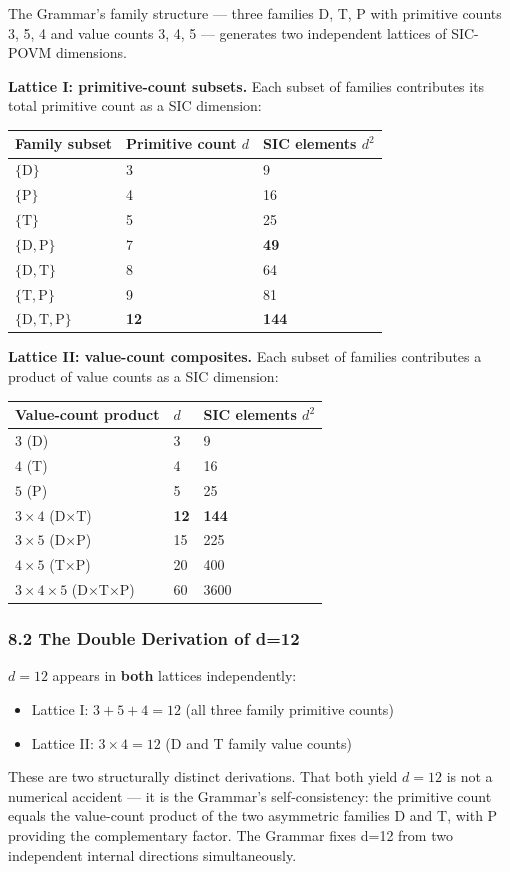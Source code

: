 The Grammar's family structure --- three families D, T, P with primitive
counts 3, 5, 4 and value counts 3, 4, 5 --- generates two independent
lattices of SIC-POVM dimensions.

\textbf{Lattice I: primitive-count subsets.} Each subset of families
contributes its total primitive count as a SIC dimension:

\begin{longtable}[]{@{}lll@{}}
\toprule
Family subset & Primitive count \(d\) & SIC elements
\(d^2\)\tabularnewline
\midrule
\endhead
\(\{\mathrm{D}\}\) & 3 & 9\tabularnewline
\(\{\mathrm{P}\}\) & 4 & 16\tabularnewline
\(\{\mathrm{T}\}\) & 5 & 25\tabularnewline
\(\{\mathrm{D,P}\}\) & 7 & \textbf{49}\tabularnewline
\(\{\mathrm{D,T}\}\) & 8 & 64\tabularnewline
\(\{\mathrm{T,P}\}\) & 9 & 81\tabularnewline
\(\{\mathrm{D,T,P}\}\) & \textbf{12} & \textbf{144}\tabularnewline
\bottomrule
\end{longtable}

\textbf{Lattice II: value-count composites.} Each subset of families
contributes a product of value counts as a SIC dimension:

\begin{longtable}[]{@{}lll@{}}
\toprule
Value-count product & \(d\) & SIC elements \(d^2\)\tabularnewline
\midrule
\endhead
\(3\) (D) & 3 & 9\tabularnewline
\(4\) (T) & 4 & 16\tabularnewline
\(5\) (P) & 5 & 25\tabularnewline
\(3 \times 4\) (D×T) & \textbf{12} & \textbf{144}\tabularnewline
\(3 \times 5\) (D×P) & 15 & 225\tabularnewline
\(4 \times 5\) (T×P) & 20 & 400\tabularnewline
\(3 \times 4 \times 5\) (D×T×P) & 60 & 3600\tabularnewline
\bottomrule
\end{longtable}

\hypertarget{the-double-derivation-of-d12}{%
\subsubsection{8.2 The Double Derivation of
d=12}\label{the-double-derivation-of-d12}}

\(d=12\) appears in \textbf{both} lattices independently:

\begin{itemize}
\tightlist
\item
  Lattice I: \(3 + 5 + 4 = 12\) (all three family primitive counts)
\item
  Lattice II: \(3 \times 4 = 12\) (D and T family value counts)
\end{itemize}

These are two structurally distinct derivations. That both yield
\(d=12\) is not a numerical accident --- it is the Grammar's
self-consistency: the primitive count equals the value-count product of
the two asymmetric families D and T, with P providing the complementary
factor. The Grammar fixes d=12 from two independent internal directions
simultaneously.

